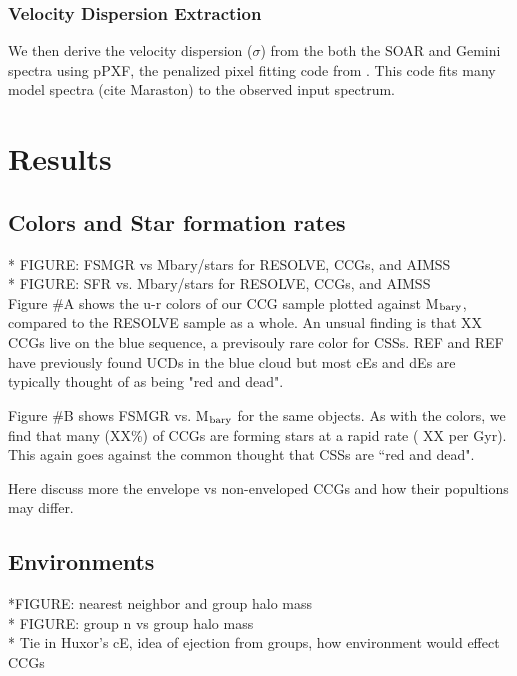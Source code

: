 \documentclass[iop,apj,twocolappendix]{emulateapj}
\begin{document}
\subsubsection{Velocity Dispersion Extraction}

\noindent We then derive the velocity dispersion ($\sigma$) from the both the SOAR and Gemini spectra using {\sc pPXF}, the penalized pixel fitting code from \citet{Cappellari2004}. This code fits many model spectra (cite Maraston) to the observed input spectrum.  

\section{Results}

\subsection{Colors and Star formation rates}
\noindent 
* FIGURE: FSMGR vs Mbary/stars for RESOLVE, CCGs, and AIMSS \\
* FIGURE: SFR vs. Mbary/stars for RESOLVE, CCGs, and AIMSS \\

\noindent Figure \#A shows the u-r colors of our CCG sample plotted against M$_{\rm bary}$, compared to the RESOLVE sample as a whole. An unsual finding is that XX CCGs live on the blue sequence, a previsouly rare color for CSSs. REF and REF have previously found UCDs in the blue cloud but most cEs and dEs are typically thought of as being "red and dead".

Figure \#B shows FSMGR vs. M$_{\rm bary}$ for the same objects. As with the colors, we find that many (XX\%) of CCGs are forming stars at a rapid rate ( XX per Gyr). This again goes against the common thought that CSSs are ``red and dead".

Here discuss more the envelope vs non-enveloped CCGs and how their popultions may differ.

\subsection{Environments}
\noindent 
 *FIGURE: nearest neighbor and group halo mass\\
* FIGURE: group n vs group halo mass  \\
* Tie in Huxor's cE, idea of ejection from groups, how environment would effect CCGs
\end{document}
